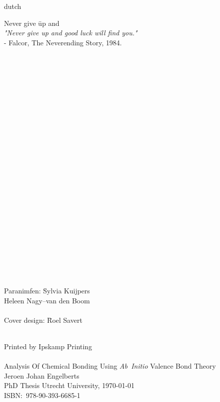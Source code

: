 \begin{otherlanguage*}{dutch}
\newpage
\raggedright
\noindent
\begin{tabbing}
Never give \= up and \kill\\
\textit{"Never give up and good luck will find you."}\\
\> - Falcor, The Neverending Story, 1984.
\end{tabbing}
\mbox{ }\\
\mbox{ }\\
\mbox{ }\\
\mbox{ }\\
\mbox{ }\\
\mbox{ }\\
\mbox{ }\\
\mbox{ }\\
\mbox{ }\\
\mbox{ }\\
\mbox{ }\\
\mbox{ }\\
\mbox{ }\\
\mbox{ }\\
\mbox{ }\\
\mbox{ }\\
\mbox{ }\\
\mbox{ }\\
\mbox{ }\\
\mbox{ }\\
\mbox{ }\\
\mbox{ }\\
\mbox{ }\\
\begin{tabbing}
Paranimfen: \=Sylvia Kuijpers\\
            \>Heleen Nagy--van den Boom\\
\\
Cover design: \=Roel Savert\\
\end{tabbing}
\end{otherlanguage*}
\mbox{ }\\
Printed by Ipskamp Printing\\
\mbox{ }\\
Analysis Of Chemical Bonding Using \textit{Ab~Initio} Valence Bond Theory\\
Jeroen Johan Engelberts\\
PhD Thesis Utrecht University, \today \\
ISBN:~978-90-393-6685-1
\newpage

\tableofcontents

\mainmatter \pagestyle{fancy}

